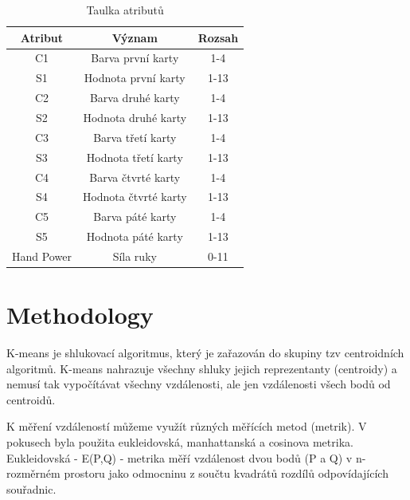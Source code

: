 \documentclass[journal]{IEEEtran}
\begin{document}
\begin{table}
\renewcommand{\arraystretch}{1.3}
\caption{Taulka atribut\r{u}}
\label{table_example}
\centering
\begin{tabular}{|c|c|c|}

\hline
Atribut & V\'{y}znam & Rozsah \\
\hline
\hline
C1 & Barva prvn\'{i} karty & 1-4\\
\hline
S1 & Hodnota prvn\'{i} karty & 1-13\\
\hline
C2 & Barva druh\'{e} karty & 1-4\\
\hline
S2 & Hodnota druh\'{e} karty & 1-13\\
\hline
C3 & Barva t\v{r}et\'{i} karty & 1-4\\
\hline
S3 & Hodnota t\v{r}et\'{i} karty & 1-13\\
\hline
C4 & Barva \v{c}tvrt\'{e} karty & 1-4\\
\hline
S4 & Hodnota \v{c}tvrt\'{e} karty & 1-13\\
\hline
C5 & Barva p\'{a}t\'{e} karty & 1-4\\
\hline
S5 & Hodnota p\'{a}t\'{e} karty & 1-13\\
\hline
Hand Power & S\'{i}la ruky & 0-11\\
\hline



\end{tabular}
\end{table}
\section{Methodology}
K-means je shlukovac\'{i} algoritmus, kter\'{y} je za\v{r}azov\'{a}n do skupiny tzv centroidn\'{i}ch algoritm\r{u}. K-means nahrazuje v\v{s}echny shluky jejich reprezentanty (centroidy) a nemus\'{i} tak vypo\v{c}\'{i}t\'{a}vat v\v{s}echny vzd\'{a}lenosti, ale jen vzd\'{a}lenosti v\v{s}ech bod\r{u} od centroid\r{u}.


K m\v{e}\v{r}en\'{i} vzd\'{a}lenost\'{i} m\r{u}\v{z}eme vyu\v{z}\'{i}t r\r{u}zn\'{y}ch m\v{e}\v{r}\'{i}c\'{i}ch metod (metrik). V pokusech byla pou\v{z}ita eukleidovsk\'{a}, manhattansk\'{a} a cosinova metrika. Eukleidovsk\'{a} - E(P,Q) - metrika m\v{e}\v{r}\'{i} vzd\'{a}lenost dvou bod\r{u} (P a Q) v n-rozm\v{e}rn\'{e}m prostoru jako odmocninu z sou\v{c}tu kvadr\'{a}t\r{u} rozd\'{i}l\r{u} odpov\'{i}daj\'{i}c\'{i}ch sou\v{r}adnic.
\end{document}
